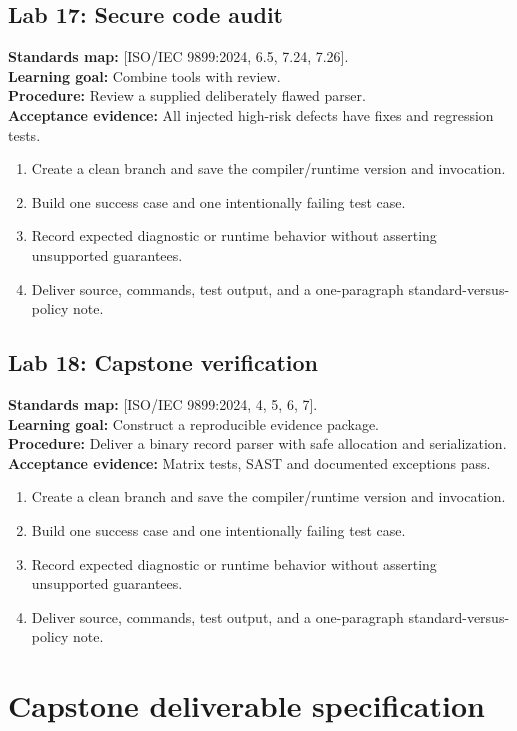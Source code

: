 \documentclass[10pt,letterpaper,oneside]{report}
\newcommand{\refcl}[1]{\textsf{\footnotesize[ISO/IEC 9899:2024, #1]}}
\begin{document}
\section{Lab 17: Secure code audit}
\textbf{Standards map:} \refcl{6.5, 7.24, 7.26}.\\
\textbf{Learning goal:} Combine tools with review.\\
\textbf{Procedure:} Review a supplied deliberately flawed parser.\\
\textbf{Acceptance evidence:} All injected high-risk defects have fixes and regression tests.
\begin{enumerate}
\item Create a clean branch and save the compiler/runtime version and invocation.
\item Build one success case and one intentionally failing test case.
\item Record expected diagnostic or runtime behavior without asserting unsupported guarantees.
\item Deliver source, commands, test output, and a one-paragraph standard-versus-policy note.
\end{enumerate}

\section{Lab 18: Capstone verification}
\textbf{Standards map:} \refcl{4, 5, 6, 7}.\\
\textbf{Learning goal:} Construct a reproducible evidence package.\\
\textbf{Procedure:} Deliver a binary record parser with safe allocation and serialization.\\
\textbf{Acceptance evidence:} Matrix tests, SAST and documented exceptions pass.
\begin{enumerate}
\item Create a clean branch and save the compiler/runtime version and invocation.
\item Build one success case and one intentionally failing test case.
\item Record expected diagnostic or runtime behavior without asserting unsupported guarantees.
\item Deliver source, commands, test output, and a one-paragraph standard-versus-policy note.
\end{enumerate}

\chapter{Capstone deliverable specification}
\end{document}
